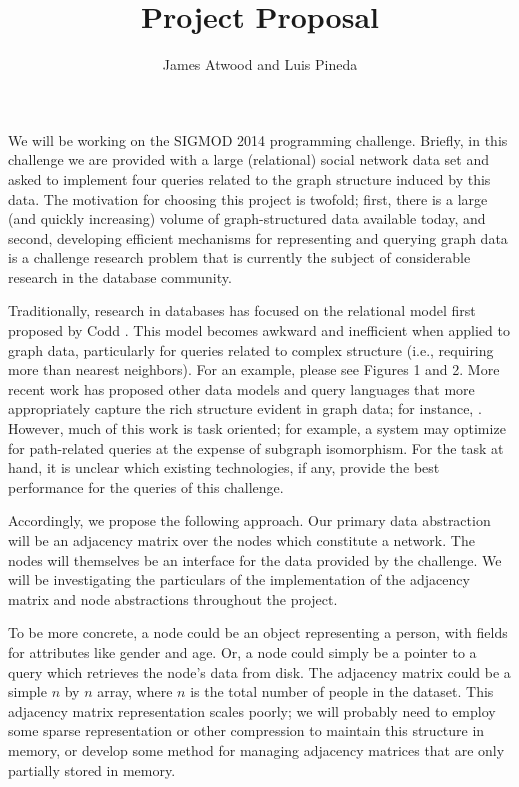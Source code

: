 \documentclass{article}
\title{Project Proposal}
\author{
James Atwood and Luis Pineda \\ %
}
\begin{document}
\maketitle

We will be working on the SIGMOD 2014 programming challenge.  Briefly, in this challenge we are provided with a large (relational) social network data set and asked to implement four queries related to the graph structure induced by this data.  The motivation for choosing this project is twofold; first, there is a large (and quickly increasing) volume of graph-structured data available today, and second, developing efficient mechanisms for representing and querying graph data is a challenge research problem that is currently the subject of considerable research in the database community.

Traditionally, research in databases has focused on the relational model first proposed by Codd \cite{codd1970relational}.  This model becomes awkward and inefficient when applied to graph data, particularly for queries related to complex structure (i.e., requiring more than nearest neighbors).  For an example, please see \cite{he2008graphs} Figures 1 and 2.  More recent work has proposed other data models and query languages that more appropriately capture the rich structure evident in graph data; for instance, \cite{he2008graphs,sun2012efficient,low2010graphlab}.  However, much of this work is task oriented; for example, a system may optimize for path-related queries at the expense of subgraph isomorphism.  For the task at hand, it is unclear which existing technologies, if any, provide the best performance for the queries of this challenge.

Accordingly, we propose the following approach.  Our primary data abstraction will be an adjacency matrix over the nodes which constitute a network.  The nodes will themselves be an interface for the data provided by the challenge.  We will be investigating the particulars of the implementation of the adjacency matrix and node abstractions throughout the project.

To be more concrete, a node could be an object representing a person, with fields for attributes like gender and age.  Or, a node could simply be a pointer to a query which retrieves the node's data from disk.  The adjacency matrix could be a simple $n$ by $n$ array, where $n$ is the total number of people in the dataset.  This adjacency matrix representation scales poorly; we will probably need to employ some sparse representation or other compression to maintain this structure in memory, or develop some method for managing adjacency matrices that are only partially stored in memory.
\end{document}
